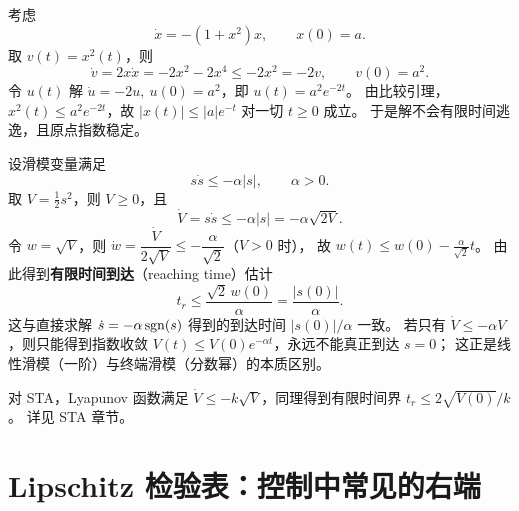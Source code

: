 \begin{example}[用比较引理证明全局存在]\label{ex:comparison-bound}
  考虑
  \begin{equation}
    \dot x=-(1+x^2)x,\qquad x(0)=a .
  \end{equation}
  取 $v(t)=x^2(t)$，则
  \[
    \dot v=2x\dot x=-2x^2-2x^4\le-2x^2=-2v,
    \qquad v(0)=a^2 .
  \]
  令 $u(t)$ 解 $\dot u=-2u,\ u(0)=a^2$，即 $u(t)=a^2e^{-2t}$。
  由比较引理，$x^2(t)\le a^2e^{-2t}$，故 $|x(t)|\le|a|e^{-t}$ 对一切 $t\ge0$ 成立。
  于是解不会有限时间逃逸，且原点指数稳定。
  \cite[Example 3.8]{khalilNonlinearSystems}
\end{example}

\begin{example}[滑模到达时间的有限时间估计]\label{ex:reaching-time}
  设滑模变量满足
  \begin{equation}\label{eq:reaching-condition}
    s\dot s\le-\alpha|s|,\qquad \alpha>0 .
  \end{equation}
  取 $V=\frac12s^2$，则 $V\ge0$，且
  \[
    \dot V=s\dot s\le-\alpha|s|=-\alpha\sqrt{2V}.
  \]
  令 $w=\sqrt V$，则 $\dot w=\dfrac{\dot V}{2\sqrt V}\le-\dfrac{\alpha}{\sqrt2}$（$V>0$ 时），
  故 $w(t)\le w(0)-\frac{\alpha}{\sqrt2}t$。
  由此得到\textbf{有限时间到达}（reaching time）估计
  \begin{equation}
    t_r\le\frac{\sqrt2\,w(0)}{\alpha}=\frac{|s(0)|}{\alpha}.
  \end{equation}
  这与直接求解 $\dot s=-\alpha\operatorname{sgn}(s)$ 得到的到达时间 $|s(0)|/\alpha$ 一致。
  若只有 $\dot V\le-\alpha V$，则只能得到指数收敛 $V(t)\le V(0)e^{-\alpha t}$，永远不能真正到达 $s=0$；
  这正是线性滑模（一阶）与终端滑模（分数幂）的本质区别。
\end{example}

\begin{remark}[超螺旋算法的情形]
  对 STA，Lyapunov 函数满足 $\dot V\le-k\sqrt V$，同理得到有限时间界 $t_r\le 2\sqrt{V(0)}/k$。
  详见 STA 章节。
\end{remark}

\section{Lipschitz 检验表：控制中常见的右端}\label{sec:lipschitz-table}

